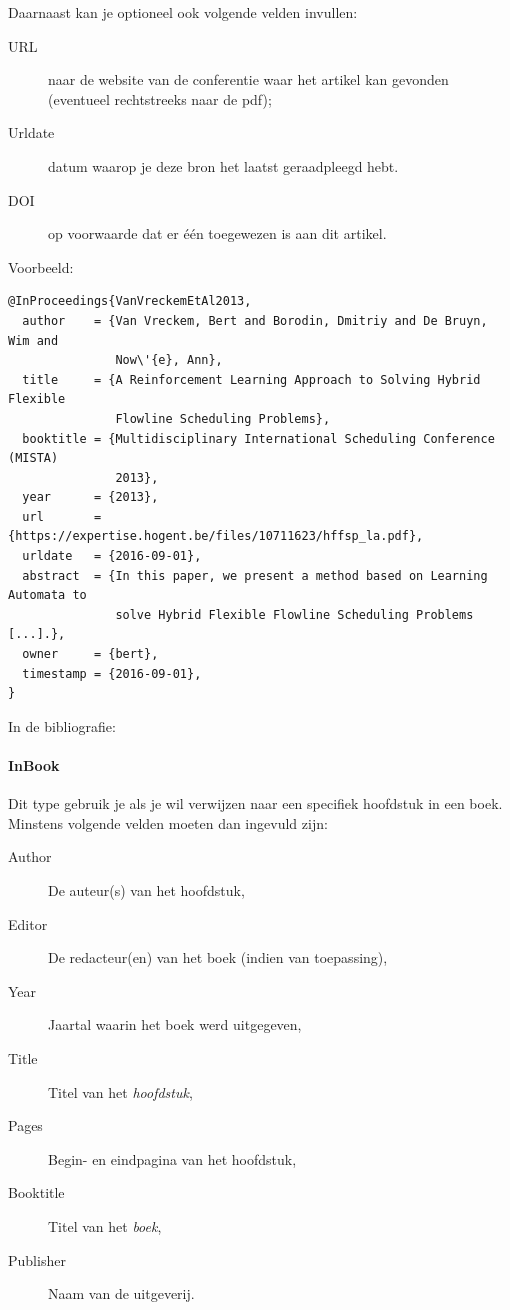 Daarnaast kan je optioneel ook volgende velden invullen:

\begin{description}
  \item[URL] naar de website van de conferentie waar het artikel kan gevonden (eventueel rechtstreeks naar de pdf);
  \item[Urldate] datum waarop je deze bron het laatst geraadpleegd hebt.
  \item[DOI] op voorwaarde dat er één toegewezen is aan dit artikel.
\end{description}

Voorbeeld:
\begin{verbatim}
@InProceedings{VanVreckemEtAl2013,
  author    = {Van Vreckem, Bert and Borodin, Dmitriy and De Bruyn, Wim and
               Now\'{e}, Ann},
  title     = {A Reinforcement Learning Approach to Solving Hybrid Flexible
               Flowline Scheduling Problems},
  booktitle = {Multidisciplinary International Scheduling Conference (MISTA)
               2013},
  year      = {2013},
  url       = {https://expertise.hogent.be/files/10711623/hffsp_la.pdf},
  urldate   = {2016-09-01},
  abstract  = {In this paper, we present a method based on Learning Automata to
               solve Hybrid Flexible Flowline Scheduling Problems [...].},
  owner     = {bert},
  timestamp = {2016-09-01},
}
\end{verbatim}

In de bibliografie: 

\paragraph{InBook}

Dit type gebruik je als je wil verwijzen naar een specifiek hoofdstuk in een boek. Minstens volgende velden moeten dan ingevuld zijn:

\begin{description}
  \item[Author] De auteur(s) van het hoofdstuk,
  \item[Editor] De redacteur(en) van het boek (indien van toepassing),
  \item[Year] Jaartal waarin het boek werd uitgegeven,
  \item[Title] Titel van het \emph{hoofdstuk},
  \item[Pages] Begin- en eindpagina van het hoofdstuk,
  \item[Booktitle] Titel van het \emph{boek},
  \item[Publisher] Naam van de uitgeverij.
\end{description}

